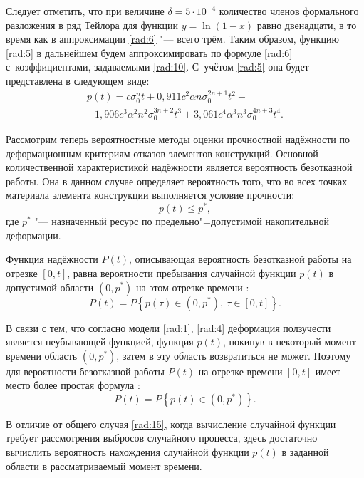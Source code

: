 Следует отметить, что при величине $\delta=5\cdot10^{-4}$ количество членов формального разложения в ряд Тейлора для функции $y=\ln(1-x)$ равно двенадцати, в то время как в аппроксимации \eqref{rad:6} "--- всего трём. 
Таким образом, функцию \eqref{rad:5} в дальнейшем будем аппроксимировать по формуле \eqref{rad:6} с~коэффициентами, задаваемыми \eqref{rad:10}. 
С~учётом \eqref{rad:5} она будет представлена в следующем виде:
\begin{multline}
p(t)=c\sigma_0^nt+0,911c^2\alpha n\sigma_0^{2n+1}t^2- \\ -1,906c^3\alpha^2n^2\sigma_0^{3n+2}t^3
+3,061c^4\alpha^3n^3\sigma_0^{4n+3}t^4.
\label{rad:13}
\end{multline}

\smallskip

 Рассмотрим теперь вероятностные методы оценки прочностной надёжности по деформационным критериям отказов элементов конструкций. Основной количественной характеристикой надёжности является вероятность безотказной работы. Она в данном случае определяет вероятность того, что во всех точках материала элемента конструкции выполняется условие прочности:
\begin{equation}
p(t)\leq p^{\ast},
\label{rad:14}
\end{equation}
где  $p^{\ast}$ "--- назначенный ресурс по предельно"=допустимой накопительной деформации.

Функция надёжности $P(t)$, описывающая вероятность безотказной работы на отрезке $[0, t]$, равна вероятности пребывания случайной функции $p(t)$ в допустимой области $(0, p^{\ast})$ на этом отрезке времени \cite{rad:bib:2}:
\begin{equation}
P(t)=P\left\{p(\tau)\in(0, p^{\ast}), \ \tau\in[0, t]\right\}.
\label{rad:15}
\end{equation}

В связи с тем, что согласно модели \eqref{rad:1}, \eqref{rad:4} деформация ползучести является неубывающей функцией, функция $p(t)$, покинув в некоторый момент времени область $(0, p^{\ast})$, затем в эту область возвратиться не может. Поэтому для вероятности безотказной работы $P(t)$ на отрезке времени $[0, t]$ имеет место более простая формула \cite{rad:bib:2}:
\begin{equation}
P(t)=P\left\{p(t)\in(0, p^{\ast})\right\}.
\label{rad:16}
\end{equation}

В отличие от общего случая \eqref{rad:15}, когда вычисление случайной функции требует рассмотрения выбросов случайного процесса, здесь достаточно вычислить вероятность  нахождения случайной функции $p(t)$ в заданной области в рассматриваемый момент времени.

